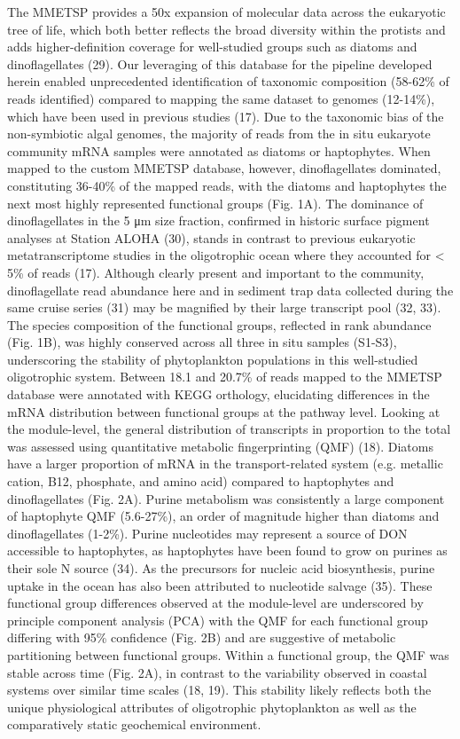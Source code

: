The MMETSP provides a 50x expansion of molecular data across the eukaryotic tree of life, which both better reflects the broad diversity within the protists and adds higher-definition coverage for well-studied groups such as diatoms and dinoflagellates (29). Our leveraging of this database for the pipeline developed herein enabled unprecedented identification of taxonomic composition (58-62\% of reads identified) compared to mapping the same dataset to genomes (12-14\%), which have been used in previous studies (17). Due to the taxonomic bias of the non-symbiotic algal genomes, the majority of reads from the in situ eukaryote community mRNA samples were annotated as diatoms or haptophytes. When mapped to the custom MMETSP database, however, dinoflagellates dominated, constituting 36-40\% of the mapped reads, with the diatoms and haptophytes the next most highly represented functional groups (Fig. 1A). The dominance of dinoflagellates in the 5 μm size fraction, confirmed in historic surface pigment analyses at Station ALOHA (30), stands in contrast to previous eukaryotic metatranscriptome studies in the oligotrophic ocean where they accounted for < 5\% of reads (17). Although clearly present and important to the community, dinoflagellate read abundance here and in sediment trap data collected during the same cruise series (31) may be magnified by their large transcript pool (32, 33). 
The species composition of the functional groups, reflected in rank abundance (Fig. 1B), was highly conserved across all three in situ samples (S1-S3), underscoring the stability of phytoplankton populations in this well-studied oligotrophic system. Between 18.1 and 20.7\% of reads mapped to the MMETSP database were annotated with KEGG orthology, elucidating differences in the mRNA distribution between functional groups at the pathway level. Looking at the module-level, the general distribution of transcripts in proportion to the total was assessed using quantitative metabolic fingerprinting (QMF) (18). Diatoms have a larger proportion of mRNA in the transport-related system (e.g. metallic cation, B12, phosphate, and amino acid) compared to haptophytes and dinoflagellates (Fig. 2A). Purine metabolism was consistently a large component of haptophyte QMF (5.6-27\%), an order of magnitude higher than diatoms and dinoflagellates (1-2\%). Purine nucleotides may represent a source of DON accessible to haptophytes, as haptophytes have been found to grow on purines as their sole N source (34). As the precursors for nucleic acid biosynthesis, purine uptake in the ocean has also been attributed to nucleotide salvage (35). These functional group differences observed at the module-level are underscored by principle component analysis (PCA) with the QMF for each functional group differing with 95\% confidence (Fig. 2B) and are suggestive of metabolic partitioning between functional groups. Within a functional group, the QMF was stable across time (Fig. 2A), in contrast to the variability observed in coastal systems over similar time scales (18, 19). This stability likely reflects both the unique physiological attributes of oligotrophic phytoplankton as well as the comparatively static geochemical environment. 
